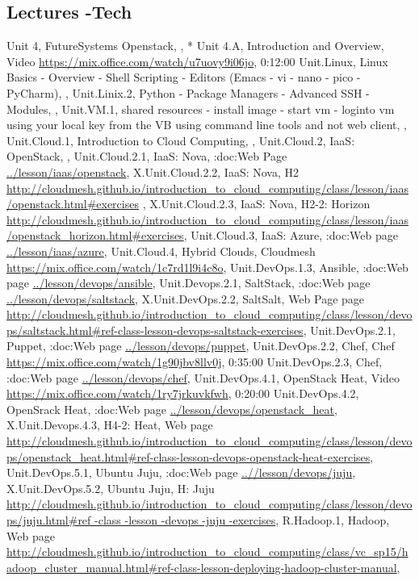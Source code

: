 \documentclass{article}
\begin{document}
\subsection{Lectures -Tech}

Unit 4, FutureSystems Openstack, , 
* Unit 4.A, Introduction and Overview, Video \url{https://mix.office.com/watch/u7uovy9i06jo}, 0:12:00
Unit.Linux, Linux Basics - Overview - Shell Scripting -  Editors (Emacs - vi - nano - pico - PyCharm), ,
Unit.Linix.2, Python - Package Managers - Advanced SSH - Modules, ,
Unit.VM.1, shared resources - install image -  start vm -  loginto vm using your local key from the VB using command line tools and not web client, ,
Unit.Cloud.1, Introduction to Cloud Computing, , 
Unit.Cloud.2, IaaS: OpenStack, ,
Unit.Cloud.2.1, IaaS: Nova, :doc:Web Page \url{../lesson/iaas/openstack},
X.Unit.Cloud.2.2, IaaS: Nova, H2 \url{http://cloudmesh.github.io/introduction_to_cloud_computing/class/lesson/iaas/openstack.html#exercises} ,
X.Unit.Cloud.2.3, IaaS: Nova, H2-2: Horizon \url{http://cloudmesh.github.io/introduction_to_cloud_computing/class/lesson/iaas/openstack_horizon.html#exercises},
Unit.Cloud.3, IaaS: Azure, :doc:Web page \url{../lesson/iaas/azure},  
Unit.Cloud.4, Hybrid Clouds, Cloudmesh \url{https://mix.office.com/watch/1c7rd1l9i4c8o},
Unit.DevOps.1.3, Ansible, :doc:Web page \url{../lesson/devops/ansible},
Unit.Devops.2.1, SaltStack, :doc:Web page \url{../lesson/devops/saltstack}, 
X.Unit.DevOps.2.2, SaltSalt, Web Page page \url{http://cloudmesh.github.io/introduction_to_cloud_computing/class/lesson/devops/saltstack.html#ref-class-lesson-devops-saltstack-exercises}, 
Unit.DevOps.2.1, Puppet, :doc:Web page \url{../lesson/devops/puppet}, 
Unit.DevOps.2.2, Chef, Chef \url{https://mix.office.com/watch/1g90jbv8llv0j}, 0:35:00
Unit.DevOps.2.3, Chef, :doc:Web page \url{../lesson/devops/chef}, 
Unit.DevOps.4.1, OpenStack Heat, Video \url{https://mix.office.com/watch/1ry7jrkuvkfwh}, 0:20:00
Unit.DevOps.4.2, OpenSrack Heat, :doc:Web page \url{../lesson/devops/openstack_heat}, 
X.Unit.Devops.4.3, H4-2: Heat, Web page \url{http://cloudmesh.github.io/introduction_to_cloud_computing/class/lesson/devops/openstack_heat.html#ref-class-lesson-devops-openstack-heat-exercises}, 
Unit.DevOps.5.1, Ubuntu Juju, :doc:Web page \url{..//lesson/devops/juju}, 
X.Unit.DevOps.5.2, Ubuntu Juju, H: Juju  \url{http://cloudmesh.github.io/introduction_to_cloud_computing/class/lesson/devops/juju.html#ref -class -lesson -devops -juju -exercises}, 
R.Hadoop.1, Hadoop, Web page \url{http://cloudmesh.github.io/introduction_to_cloud_computing/class/vc_sp15/hadoop_cluster_manual.html#ref-class-lesson-deploying-hadoop-cluster-manual}, 
\end{document}
